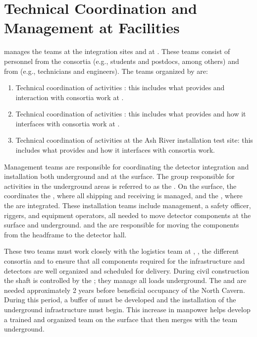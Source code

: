 \chapter{Technical Coordination and Management at Facilities}
\label{vl:tc-facility_mgmt}

  manages the teams at the integration sites and
at \surf. These teams consist of personnel from the consortia (e.g.,
students and postdocs, among others) and from  (e.g.,
technicians and engineers). The teams organized by  are:
\begin{enumerate}
 \item Technical coordination of activities \surf: this
   includes what  provides and interaction with consortia work
   at \surf.
 \item Technical coordination of activities : this includes
   what  provides and how it interfaces with consortia work at .
 \item Technical coordination of activities at the Ash River installation
   test site: this includes what  provides and how it
   interfaces with consortia work. 
\end{enumerate}

Management teams are responsible for coordinating the detector
integration and installation both underground and at the surface. The
group responsible for activities in the underground areas is referred
to as the .  On the surface, the  coordinates
the , where all  shipping and receiving is
managed, and the , where the  are integrated.
These installation teams include management, a safety officer,
riggers, and equipment operators, all needed to move detector
components at the surface and underground. \surf and the 
are responsible for moving the components from the headframe to the
detector hall.

These two teams must work closely with the  logistics team at
\surf, , the different consortia and  to
ensure that all components required for the infrastructure and
detectors are well organized and scheduled for delivery. During
civil construction the shaft is controlled by the ; they manage all loads
underground.  The  and  are
needed approximately 2 years before beneficial occupancy of the North
Cavern.  During this period, a buffer of  must be developed 
and  the installation of the underground infrastructure must begin. This
increase in manpower helps develop a trained and organized team on the
surface that then merges with the team underground.


